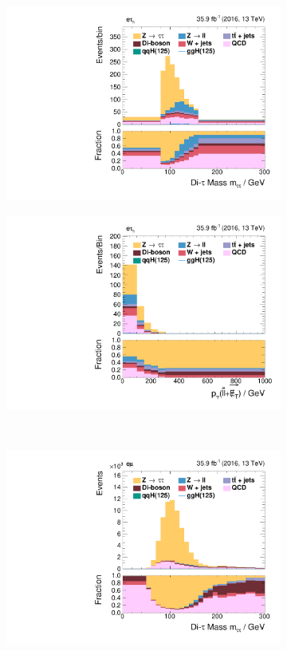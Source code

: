 \begin{figure}[h!]
\begin{subfigure}{.3\textwidth}
        \includegraphics[width=\textwidth]{Figures/eventselection/et/BoostedCP/m_sv.pdf}
    \end{subfigure}%
    \begin{subfigure}{.3\textwidth}
        \centering
        \includegraphics[width=\textwidth]{Figures/eventselection/et/BoostedCP/H_pt.pdf}
    \end{subfigure} \\
    \begin{subfigure}{.3\textwidth}
        \centering
        \includegraphics[width=\textwidth]{Figures/eventselection/em/ZeroJetCP/m_sv.pdf}

\end{subfigure}
\end{figure}
